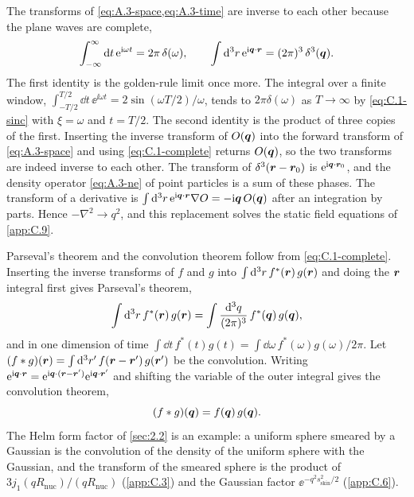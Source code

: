 The transforms of \cref{eq:A.3-space,eq:A.3-time} are inverse to each other because the plane waves are complete,
\begin{equation}
  \int_{-\infty}^{\infty}\mathrm{d} t\,\mathrm{e}^{\mathrm{i}\omega t} = 2\pi\,\delta(\omega), \qquad
  \int\mathrm{d}^3r\,\mathrm{e}^{\mathrm{i}\bm{q}\cdot\bm{r}} = (2\pi)^3\,\delta^3(\bm{q}) .
  \label{eq:C.1-complete}
\end{equation}
The first identity is the golden-rule limit once more. The integral over a finite window, $\int_{-T/2}^{T/2}\dd t\,\ee^{\ii\omega t} = 2\sin(\omega T/2)/\omega$, tends to $2\pi\delta(\omega)$ as $T\to\infty$ by \cref{eq:C.1-sinc} with $\xi = \omega$ and $t = T/2$. The second identity is the product of three copies of the first. Inserting the inverse transform of $O(\bm{q})$ into the forward transform of \cref{eq:A.3-space} and using \cref{eq:C.1-complete} returns $O(\bm{q})$, so the two transforms are indeed inverse to each other. The transform of $\delta^3(\bm{r} - \bm{r}_0)$ is $\mathrm{e}^{\mathrm{i}\bm{q}\cdot\bm{r}_0}$, and the density operator \cref{eq:A.3-ne} of point particles is a sum of these phases. The transform of a derivative is $\int\mathrm{d}^3r\,\mathrm{e}^{\mathrm{i}\bm{q}\cdot\bm{r}}\nabla O = -\mathrm{i}\bm{q}\,O(\bm{q})$ after an integration by parts. Hence $-\nabla^2 \to q^2$, and this replacement solves the static field equations of \cref{app:C.9}.

Parseval's theorem and the convolution theorem follow from \cref{eq:C.1-complete}. Inserting the inverse transforms of $f$ and $g$ into $\int\mathrm{d}^3r\,f^*(\bm{r})\,g(\bm{r})$ and doing the $\bm{r}$ integral first gives Parseval's theorem,
\begin{equation}
  \int\mathrm{d}^3r\,f^*(\bm{r})\,g(\bm{r}) = \int\frac{\mathrm{d}^3q}{(2\pi)^3}\,f^*(\bm{q})\,g(\bm{q}) ,
  \label{eq:C.1-parseval}
\end{equation}
and in one dimension of time $\int\dd t\,f^*(t)g(t) = \int\dd\omega\,f^*(\omega)g(\omega)/2\pi$. Let $(f\ast g)(\bm{r}) = \int\mathrm{d}^3r'\,f(\bm{r} - \bm{r}')\,g(\bm{r}')$ be the convolution. Writing $\mathrm{e}^{\mathrm{i}\bm{q}\cdot\bm{r}} = \mathrm{e}^{\mathrm{i}\bm{q}\cdot(\bm{r} - \bm{r}')}\mathrm{e}^{\mathrm{i}\bm{q}\cdot\bm{r}'}$ and shifting the variable of the outer integral gives the convolution theorem,
\begin{equation}
  (f\ast g)(\bm{q}) = f(\bm{q})\,g(\bm{q}) .
  \label{eq:C.1-conv}
\end{equation}
The Helm form factor of \cref{sec:2.2} is an example: a uniform sphere smeared by a Gaussian is the convolution of the density of the uniform sphere with the Gaussian, and the transform of the smeared sphere is the product of $3j_1(qR_{\mathrm{nuc}})/(qR_{\mathrm{nuc}})$ (\cref{app:C.3}) and the Gaussian factor $\ee^{-q^2s_{\mathrm{skin}}^2/2}$ (\cref{app:C.6}).

